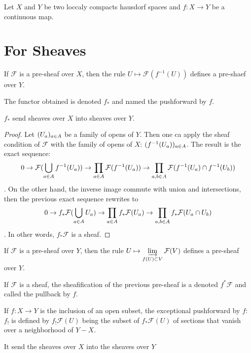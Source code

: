 Let $X$ and $Y$ be two loccaly compacts hausdorf spaces and $f:X\to Y$ be a continuous map.

\section{For Sheaves}

\begin{definition}\label{def:pushforward_of_sheaf}
    If $\mathcal{F}$ is a pre-sheaf over $X$, then the rule $U\mapsto \mathcal{F}(f^{-1}(U))$ defines a pre-shaef over $Y$.

    The functor obtained is denoted $f_*$ and named the pushforward by $f$.

    $f_*$ send sheaves over $X$ into sheaves over $Y$.
\end{definition}

\begin{proof}
    Let $(U_a)_{a\in A}$ be a family of opens of $Y$. Then one ca apply the sheaf condition of $\mathcal{F}$ with the family of opens of $X$: $(f^{-1}(U_a))_{a\in A}$. The result is the exact sequence: \[0\to \mathcal{F}(\bigcup\limits_{a\in A}f^{-1}(U_a))\to \prod\limits_{a\in A}\mathcal{F}(f^{-1}(U_a))\to \prod\limits_{a,b\in A}\mathcal{F}(f^{-1}(U_a)\cap f^{-1}(U_b))\]. 
    On the other hand, the inverse image commute with union and intersections, then the previous exact sequence rewrites to \[0\to f_*\mathcal{F}(\bigcup\limits_{a\in A}U_a)\to \prod\limits_{a\in A}f_*\mathcal{F}(U_a)\to \prod\limits_{a,b\in A}f_*\mathcal{F}(U_a\cap U_b)\]. 
    In other words, $f_*\mathcal{F}$ is a sheaf.
\end{proof}

\begin{definition}\label{def:pullback_of_sheaf}
    If $\mathcal{F}$ is a pre-sheaf over $Y$, then the rule $U\mapsto \varinjlim\limits_{f(U)\subset V}\mathcal{F}(V)$ defines a pre-sheaf over $Y$.

    If $\mathcal{F}$ is a sheaf, the sheafification of the previous pre-sheaf is a denoted $f^*\mathcal{F}$ and called the pullback by $f$.

\end{definition}

\begin{definition}\label{def:exceptional_pushforward_of_sheaf}
    If $f:X\to Y$ is the inclusion of an open subset, the exceptional pushforward by $f$: $f_!$ is defined by $f_!\mathcal{F}(U)$ being the subset of $f_*\mathcal{F}(U)$ of sections that vanish over a neighborhood of $Y-X$.

    It send the sheaves over $X$ into the sheaves over $Y$
\end{definition}

